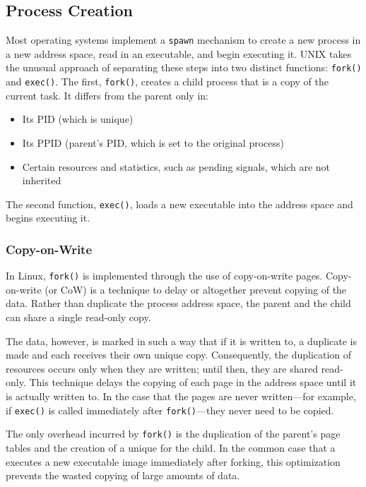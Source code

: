 \subsection{Process Creation}\label{subsec:Process_Creation}
Most operating systems implement a \texttt{spawn} mechanism to create a new process in a new address space, read in an executable, and begin executing it.
UNIX takes the unusual approach of separating these steps into two distinct functions: \texttt{fork()} and \texttt{exec()}.
The first, \texttt{fork()}, creates a child process that is a copy of the current task.
It differs from the parent only in:
\begin{itemize}[noitemsep]
\item Its PID (which is unique)
\item Its PPID (parent’s PID, which is set to the original process)
\item Certain resources and statistics, such as pending signals, which are not inherited
\end{itemize}

The second function, \texttt{exec()}, loads a new executable into the address space and begins executing it.

\subsubsection{Copy-on-Write}\label{subsubsec:Process_Copy_on_Write}
In Linux, \texttt{fork()} is implemented through the use of copy-on-write pages.
Copy-on-write (or CoW) is a technique to delay or altogether prevent copying of the data.
Rather than duplicate the process address space, the parent and the child can share a single read-only copy.

The data, however, is marked in such a way that if it is written to, a duplicate is made and each  receives their own unique copy.
Consequently, the duplication of resources occurs only when they are written; until then, they are shared read-only.
This technique delays the copying of each page in the address space until it is actually written to.
In the case that the pages are never written—for example, if \texttt{exec()} is called immediately after \texttt{fork()}—they never need to be copied.

The only overhead incurred by \texttt{fork()} is the duplication of the parent’s page tables and the creation of a unique  for the child.
In the common case that a  executes a new executable image immediately after forking, this optimization prevents the wasted copying of large amounts of data.


